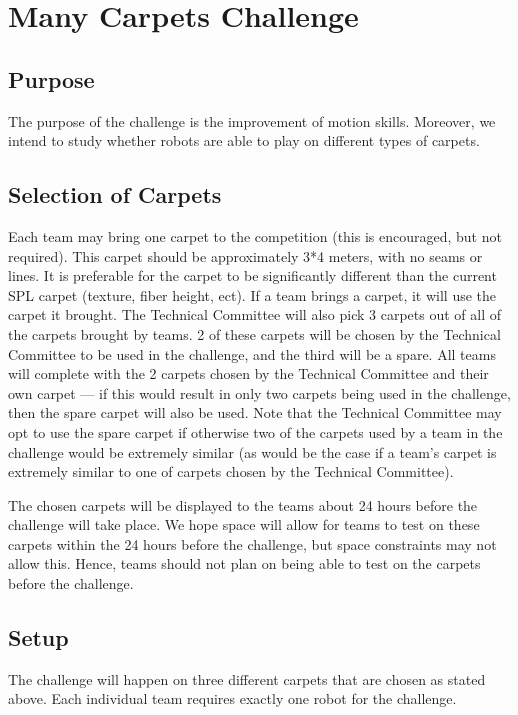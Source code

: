 \documentclass[12pt]{article}
\begin{document}
\section{Many Carpets Challenge}

\subsection{Purpose}

The purpose of the challenge is the improvement of motion skills. Moreover, we intend to study whether robots are able to play on different types of carpets.

\subsection{Selection of Carpets}

Each team may bring one carpet to the competition (this is encouraged, but not required). This carpet should be approximately 3*4 meters, with no seams or lines.  It is preferable for the carpet to be significantly different than the current SPL carpet (texture, fiber height, ect). If a team brings a carpet, it will use the carpet it brought.  The Technical Committee will also pick 3 carpets out of all of the carpets brought by teams.  2 of these carpets will be chosen by the Technical Committee to be used in the challenge, and the third will be a spare.  All teams will complete with the 2 carpets chosen by the Technical Committee and their own carpet --- if this would result in only two carpets being used in the challenge, then the spare carpet will also be used.  Note that the Technical Committee may opt to use the spare carpet if otherwise two of the carpets used by a team in the challenge would be extremely similar (as would be the case if a team's carpet is extremely similar to one of carpets chosen by the Technical Committee).

The chosen carpets will be displayed to the teams about 24 hours before the challenge will take place.  We hope space will allow for teams to test on these carpets within the 24 hours before the challenge, but space constraints may not allow this.  Hence, teams should not plan on being able to test on the carpets before the challenge.

\subsection{Setup}

The challenge will happen on three different carpets that are chosen as stated above.   Each individual team requires exactly one robot for the challenge.
\end{document}
